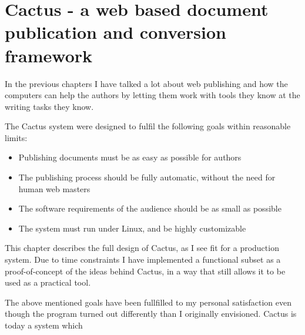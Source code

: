 



\chapter{Cactus - a web based document publication and conversion
  framework}

\label{cha:cactus}
\label{sec:cactus}

In the previous chapters I have talked a lot about web publishing and
how the computers can help the authors by letting them work with tools
they know at the writing tasks they know.

The Cactus system were designed to fulfil the following goals within
reasonable limits:

\begin{itemize}
\item Publishing documents must be as easy as possible for authors

\item The publishing process should be fully automatic, without the
  need for human web masters

\item The software requirements of the audience should be as small as
  possible

\item The system must run under Linux, and be highly customizable

\end{itemize}

This chapter describes the full design of Cactus, as I see fit for a
production system.  Due to time constraints I have implemented a
functional subset as a proof-of-concept of the ideas behind Cactus, in
a way that still allows it to be used as a practical tool.

The above mentioned goals have been fullfilled to my personal
satisfaction even though the program turned out differently than I
originally envisioned. Cactus is today a system which

